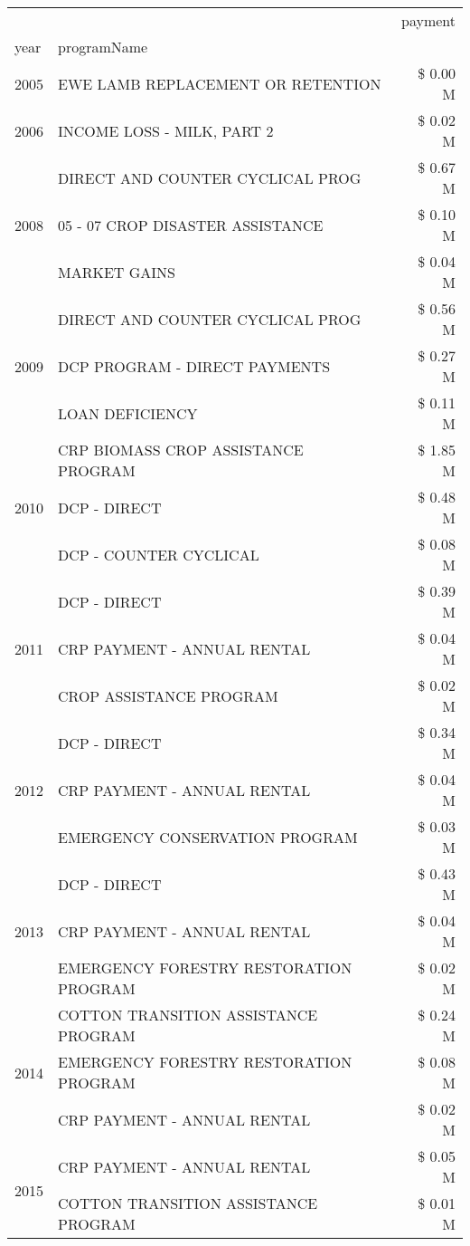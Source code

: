 \begin{tabular}{llr}
\toprule
 &  & payment \\
year & programName &  \\
\midrule
2005 & EWE LAMB REPLACEMENT OR RETENTION & \$ 0.00 M \\
\cline{1-3}
2006 & INCOME LOSS - MILK, PART 2 & \$ 0.02 M \\
\cline{1-3}
\multirow[t]{3}{*}{2008} & DIRECT AND COUNTER CYCLICAL PROG & \$ 0.67 M \\
 & 05 - 07 CROP DISASTER ASSISTANCE & \$ 0.10 M \\
 & MARKET GAINS & \$ 0.04 M \\
\cline{1-3}
\multirow[t]{3}{*}{2009} & DIRECT AND COUNTER CYCLICAL PROG & \$ 0.56 M \\
 & DCP PROGRAM - DIRECT PAYMENTS & \$ 0.27 M \\
 & LOAN DEFICIENCY & \$ 0.11 M \\
\cline{1-3}
\multirow[t]{3}{*}{2010} & CRP BIOMASS CROP ASSISTANCE PROGRAM & \$ 1.85 M \\
 & DCP - DIRECT & \$ 0.48 M \\
 & DCP - COUNTER CYCLICAL & \$ 0.08 M \\
\cline{1-3}
\multirow[t]{3}{*}{2011} & DCP - DIRECT & \$ 0.39 M \\
 & CRP PAYMENT - ANNUAL RENTAL & \$ 0.04 M \\
 & CROP ASSISTANCE PROGRAM & \$ 0.02 M \\
\cline{1-3}
\multirow[t]{3}{*}{2012} & DCP - DIRECT & \$ 0.34 M \\
 & CRP PAYMENT - ANNUAL RENTAL & \$ 0.04 M \\
 & EMERGENCY CONSERVATION PROGRAM & \$ 0.03 M \\
\cline{1-3}
\multirow[t]{3}{*}{2013} & DCP - DIRECT & \$ 0.43 M \\
 & CRP PAYMENT - ANNUAL RENTAL & \$ 0.04 M \\
 & EMERGENCY FORESTRY RESTORATION PROGRAM & \$ 0.02 M \\
\cline{1-3}
\multirow[t]{3}{*}{2014} & COTTON TRANSITION ASSISTANCE PROGRAM & \$ 0.24 M \\
 & EMERGENCY FORESTRY RESTORATION PROGRAM & \$ 0.08 M \\
 & CRP PAYMENT - ANNUAL RENTAL & \$ 0.02 M \\
\cline{1-3}
\multirow[t]{3}{*}{2015} & CRP PAYMENT - ANNUAL RENTAL & \$ 0.05 M \\
 & COTTON TRANSITION ASSISTANCE PROGRAM & \$ 0.01 M \\

\end{tabular}
